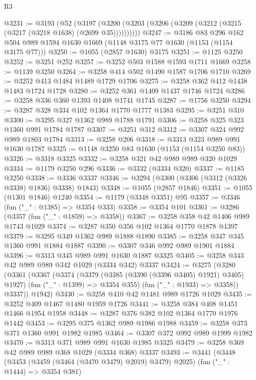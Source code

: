 \begin{lexlean}{R3}
\begin{coremodule}
@3231 := @3193
    (@52 (@3197 (@3200 (@3203 (@3206 (@3209 (@3212 (@3215 (@3217 (@3218 @1638) (@2699 @35))))))))))
@3247 := @3186
    @83
    @296
    @162
    @504
    @989
    @1594
    @1630
    @1669
    (@1148 @3175 @77 @1630 (@1153 (@1154 @3175 @77)))
@3250 := @1055 (@2857 @1630) @3175
@3251 := @1125 @3250
@3252 := @3251 @252
@3257 := @3252 @503 @1588 @1593 @1711 @1669
@3258 := @1139 @3250
@3264 := @3258 @414 @502 @1490 @1587 @1706 @1710
@3269 := @3252 @413 @1484 @1489 @1729 @1706
@3275 := @3258 @362 @412 @1438 @1483 @1724 @1728
@3280 := @3252 @361 @1409 @1437 @1746 @1724
@3286 := @3258 @336 @360 @1393 @1408 @1741 @1745
@3287 := @1756 @3250
@3294 := @3287 @328 @334 @102 @1364 @1770 @1777 @1383
@3295 := @3251 @310
@3300 := @3295 @327 @1362 @989 @1788 @1791
@3306 := @3258 @325 @323 @1360 @991 @1784 @1787
@3307 := @3251 @312
@3312 := @3307 @324 @992 @989 @1803 @1784
@3313 := @3258 @206
@3318 := @3313 @323 @989 @991 @1630 @1787
@3325 := @1148 @3250 @83 @1630 (@1153 (@1154 @3250 @83))
@3326 := @3318 @3325
@3332 := @3258 @321 @42 @989 @989 @320 @1029
@3334 := @1179 @3250 @296
@3336 := @3332 (@3334 @320)
@3337 := @1185 @3250
@3338 := @3336 @3337
@3346 := @3294 (@3300 (@3306 (@3312 (@3326 @3338) @1836) @3338) @1843)
@3348 := @1055 (@2857 @1846)
@3351 := @1055 (@1301 @1846) @1240
@3354 := @1179 (@3348 @3351) @95
@3357 := @3346 (fun ("_" : @1385) => @3354 @333)
@3358 := @3354 @101
@3361 := @3286 (@3357 (fun ("_" : @1859) => @3358))
@3367 := @3258 @358 @42 @1406 @989 @1743 @1029
@3374 := @3287 @350 @356 @102 @1364 @1770 @1878 @1397
@3379 := @3295 @349 @1362 @989 @1888 @1890
@3385 := @3258 @347 @345 @1360 @991 @1884 @1887
@3390 := @3307 @346 @992 @989 @1901 @1884
@3396 := @3313 @345 @989 @991 @1630 @1887 @3325
@3405 := @3258 @343 @42 @989 @989 @342 @1029 (@3334 @342) @3337
@3424 := @3275
    (@3280
      (@3361
        (@3367
          (@3374
            (@3379 (@3385 (@3390 (@3396 @3405) @1921) @3405) @1927)
            (fun ("_" : @1399) => @3354 @355)
            (fun ("_" : @1933) => @3358))
          @3337))
      @1942)
@3430 := @3258 @410 @42 @1481 @989 @1726 @1029
@3435 := @3252 @409 @1467 @1480 @1959 @1726
@3441 := @3258 @384 @408 @1451 @1466 @1954 @1958
@3448 := @3287 @376 @382 @102 @1364 @1770 @1976 @1442
@3453 := @3295 @375 @1362 @989 @1986 @1988
@3459 := @3258 @373 @371 @1360 @991 @1982 @1985
@3464 := @3307 @372 @992 @989 @1999 @1982
@3470 := @3313 @371 @989 @991 @1630 @1985 @3325
@3479 := @3258 @369 @42 @989 @989 @368 @1029 (@3334 @368) @3337
@3493 := @3441
    (@3448
      (@3453 (@3459 (@3464 (@3470 @3479) @2019) @3479) @2025)
      (fun ("_" : @1444) => @3354 @381)

\end{coremodule}
\end{lexlean}
